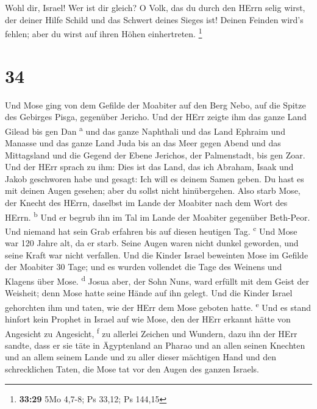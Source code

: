  Wohl dir, Israel! Wer ist dir gleich? O Volk, das du
durch den HErrn selig wirst, der deiner Hilfe Schild und das Schwert
deines Sieges ist! Deinen Feinden wird's fehlen; aber du wirst auf ihren
Höhen einhertreten. \footnote{\textbf{33:29} 5Mo 4,7-8; Ps 33,12; Ps
  144,15}

\hypertarget{section-33}{%
\section{34}\label{section-33}}

 Und Mose ging von dem Gefilde der Moabiter auf den Berg
Nebo, auf die Spitze des Gebirges Pisga, gegenüber Jericho. Und der HErr
zeigte ihm das ganze Land Gilead bis gen Dan \textsuperscript{a}
 und das ganze Naphthali und das Land Ephraim und Manasse
und das ganze Land Juda bis an das Meer gegen Abend  und
das Mittagsland und die Gegend der Ebene Jerichos, der Palmenstadt, bis
gen Zoar.  Und der HErr sprach zu ihm: Dies ist das Land,
das ich Abraham, Isaak und Jakob geschworen habe und gesagt: Ich will es
deinem Samen geben. Du hast es mit deinen Augen gesehen; aber du sollst
nicht hinübergehen.  Also starb Mose, der Knecht des
HErrn, daselbst im Lande der Moabiter nach dem Wort des HErrn.
\textsuperscript{b}  Und er begrub ihn im Tal im Lande der
Moabiter gegenüber Beth-Peor. Und niemand hat sein Grab erfahren bis auf
diesen heutigen Tag. \textsuperscript{c}  Und Mose war 120
Jahre alt, da er starb. Seine Augen waren nicht dunkel geworden, und
seine Kraft war nicht verfallen.  Und die Kinder Israel
beweinten Mose im Gefilde der Moabiter 30 Tage; und es wurden vollendet
die Tage des Weinens und Klagens über Mose. \textsuperscript{d}
 Josua aber, der Sohn Nuns, ward erfüllt mit dem Geist der
Weisheit; denn Mose hatte seine Hände auf ihn gelegt. Und die Kinder
Israel gehorchten ihm und taten, wie der HErr dem Mose geboten hatte.
\textsuperscript{e}  Und es stand hinfort kein Prophet in
Israel auf wie Mose, den der HErr erkannt hätte von Angesicht zu
Angesicht, \textsuperscript{f}  zu allerlei Zeichen und
Wundern, dazu ihn der HErr sandte, dass er sie täte in Ägyptenland an
Pharao und an allen seinen Knechten und an allem seinem Lande
 und zu aller dieser mächtigen Hand und den schrecklichen
Taten, die Mose tat vor den Augen des ganzen Israels.
